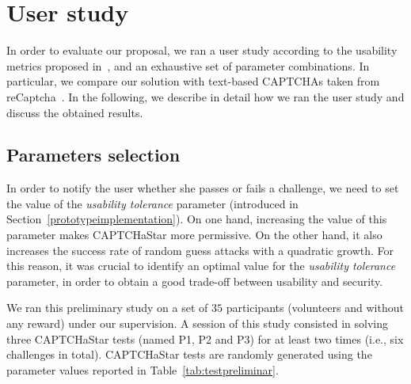 \documentclass[conference]{IEEEtran}
\newcommand{\hilight}[1]{#1}
\begin{document}
\section{User study} \label{evaluateusability}
In order to evaluate our proposal, we ran a user study according to the usability metrics proposed in~\cite{yan2008usability}, and an exhaustive set of parameter combinations.
In particular, we compare our solution with text-based CAPTCHAs taken from reCaptcha~\cite{recaptchaplugin}. 
In the following, we describe in detail how we ran the user study and discuss the obtained results.  
\subsection{Parameters selection}
\label{parametersselection}
In order to notify the user whether she passes or fails a challenge, we need to set the value of the \textit{usability tolerance} parameter (introduced in Section~\ref{prototypeimplementation}).
On one hand, increasing the value of this parameter makes CAPTCHaStar more permissive.
On the other hand, it also increases the success rate of random guess attacks with a quadratic growth.
For this reason, it was crucial to identify an optimal value for the \textit{usability tolerance} parameter, in order to obtain a good trade-off between usability and security.

We ran this preliminary study on a set of $35$ participants (volunteers and without any reward) under our supervision. A session of this study consisted in solving three CAPTCHaStar tests (named P1, P2 and P3) for at least two times (i.e., six challenges in total).
\hilight{CAPTCHaStar tests are randomly generated using the parameter values reported in Table}~\ref{tab:testpreliminar}. 

\begin{table}[ht]
\centering
{}
\caption{Values of parameters $\psi$, $\delta$, \textit{NSol} and \textit{Rotation} for the preliminary study.}
\label{tab:testpreliminar}
\end{table}
\end{document}
